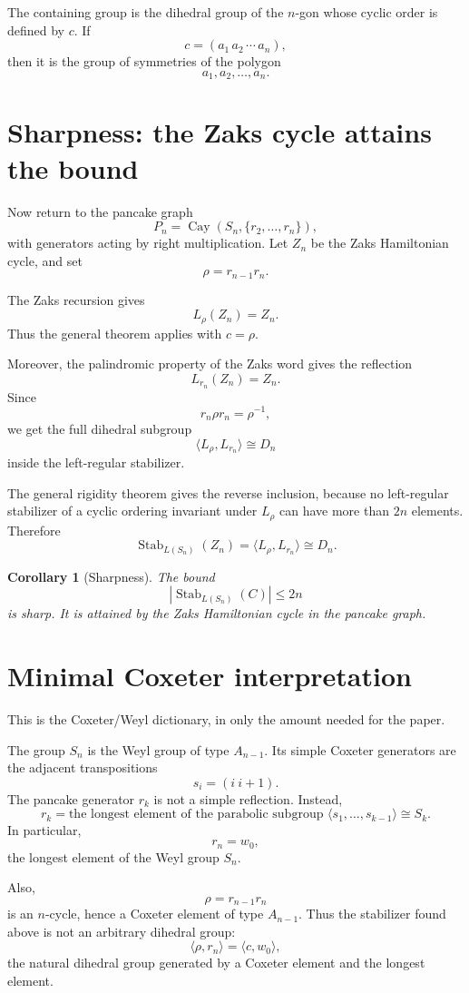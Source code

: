 \documentclass[11pt]{article}
\newtheorem{corollary}{Corollary}
\newcommand{\Stab}{\operatorname{Stab}}
\newcommand{\Cay}{\operatorname{Cay}}
\begin{document}
The containing group is the dihedral group of the $n$-gon whose cyclic order is
defined by $c$. If
\[
  c=(a_1\,a_2\,\cdots\,a_n),
\]
then it is the group of symmetries of the polygon
\[
  a_1,a_2,\ldots,a_n.
\]

\section*{Sharpness: the Zaks cycle attains the bound}

Now return to the pancake graph
\[
  P_n=\Cay(S_n,\{r_2,\ldots,r_n\}),
\]
with generators acting by right multiplication. Let $Z_n$ be the Zaks
Hamiltonian cycle, and set
\[
  \rho=r_{n-1}r_n.
\]

The Zaks recursion gives
\[
  L_\rho(Z_n)=Z_n.
\]
Thus the general theorem applies with $c=\rho$.

Moreover, the palindromic property of the Zaks word gives the reflection
\[
  L_{r_n}(Z_n)=Z_n.
\]
Since
\[
  r_n \rho r_n=\rho^{-1},
\]
we get the full dihedral subgroup
\[
  \langle L_\rho,L_{r_n}\rangle \cong D_n
\]
inside the left-regular stabilizer.

The general rigidity theorem gives the reverse inclusion, because no
left-regular stabilizer of a cyclic ordering invariant under $L_\rho$ can have
more than $2n$ elements. Therefore
\[
  \Stab_{L(S_n)}(Z_n)
  =
  \langle L_\rho,L_{r_n}\rangle
  \cong D_n.
\]

\begin{corollary}[Sharpness]
The bound
\[
  |\Stab_{L(S_n)}(C)|\leq 2n
\]
is sharp. It is attained by the Zaks Hamiltonian cycle in the pancake graph.
\end{corollary}

\section*{Minimal Coxeter interpretation}

This is the Coxeter/Weyl dictionary, in only the amount needed for the paper.

The group $S_n$ is the Weyl group of type $A_{n-1}$. Its simple Coxeter
generators are the adjacent transpositions
\[
  s_i=(i\ i+1).
\]
The pancake generator $r_k$ is not a simple reflection. Instead,
\[
  r_k
  =
  \text{the longest element of the parabolic subgroup }
  \langle s_1,\ldots,s_{k-1}\rangle
  \cong S_k.
\]
In particular,
\[
  r_n=w_0,
\]
the longest element of the Weyl group $S_n$.

Also,
\[
  \rho=r_{n-1}r_n
\]
is an $n$-cycle, hence a Coxeter element of type $A_{n-1}$. Thus the stabilizer
found above is not an arbitrary dihedral group:
\[
  \langle \rho,r_n\rangle
  =
  \langle c,w_0\rangle,
\]
the natural dihedral group generated by a Coxeter element and the longest
element.
\end{document}
